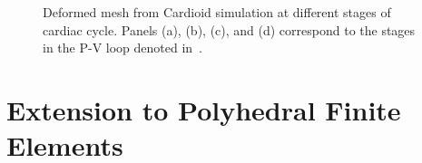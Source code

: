 \begin{figure}[ht!]
{\label{fig:snaps4}}		
%
\caption{Deformed mesh from Cardioid simulation at different stages of cardiac cycle. Panels (a), (b), (c), and (d) correspond to the stages in the P-V loop denoted in~.}
\label{fig:snaps}
\end{figure}

\section{Extension to Polyhedral Finite Elements}
\label{Polyhedral Finite Elements}

\begin{figure}[ht]
\centering
{}		

\end{figure}
